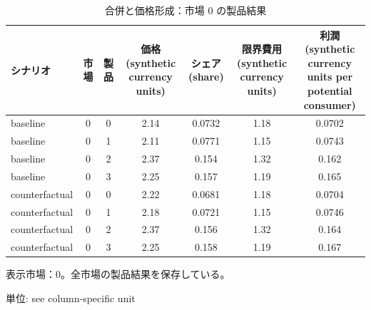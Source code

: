 \begingroup
\begin{table}[htbp]
\centering
\caption{合併と価格形成：市場 0 の製品結果}
\label{tab:specialist-blp-supply-r01-displays-equilibrium_products}
\begin{tabular}{lcccccc}
\toprule
シナリオ & 市場 & 製品 & 価格 (synthetic currency units) & シェア (share) & 限界費用 (synthetic currency units) & 利潤 (synthetic currency units per potential consumer) \\
\midrule
baseline & 0 & 0 & 2.14 & 0.0732 & 1.18 & 0.0702 \\
baseline & 0 & 1 & 2.11 & 0.0771 & 1.15 & 0.0743 \\
baseline & 0 & 2 & 2.37 & 0.154 & 1.32 & 0.162 \\
baseline & 0 & 3 & 2.25 & 0.157 & 1.19 & 0.165 \\
counterfactual & 0 & 0 & 2.22 & 0.0681 & 1.18 & 0.0704 \\
counterfactual & 0 & 1 & 2.18 & 0.0721 & 1.15 & 0.0746 \\
counterfactual & 0 & 2 & 2.37 & 0.156 & 1.32 & 0.164 \\
counterfactual & 0 & 3 & 2.25 & 0.158 & 1.19 & 0.167 \\
\bottomrule
\end{tabular}
\par\medskip\begin{minipage}{\linewidth}\footnotesize
表示市場：0。全市場の製品結果を保存している。\par 単位: see column-specific unit
\end{minipage}
\end{table}
\endgroup
